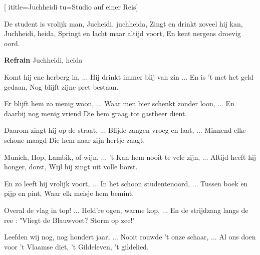  [
ititle={Juchheidi}
tu={Studio auf einer Reis}]

\beginverse
De student is vrolijk man,
Jucheidi, juchheida,
Zingt en drinkt zoveel hij kan,
Juchheidi, heida,
Springt en lacht maar altijd voort,
En kent nergens droevig oord.
\endverse

\beginchorus
\textbf{Refrain}
Juchheidi, heida
\endchorus

\beginverse
Komt hij ene herberg in, ...
Hij drinkt immer blij van zin ...
En is 't met het geld gedaan,
Nog blijft zijne pret bestaan.
\endverse

\beginverse
Er blijft hem zo menig woon, ...
Waar men bier schenkt zonder loon, ...
En daarbij nog menig vriend
Die hem graag tot gastheer dient.
\endverse

\beginverse
Daarom zingt hij op de straat, ...
Blijde zangen vroeg en laat, ...
Minnend elke schone maagd
Die hem naar zijn hertje zaagt.
\endverse

\beginverse
Munich, Hop, Lambik, of wijn, ...
't Kan hem nooit te vele zijn, ...
Altijd heeft hij honger, dorst,
Wijl hij zingt uit volle borst.
\endverse

\beginverse
En zo leeft hij vrolijk voort, ...
In het schoon studentenoord, ...
Tussen boek en pijp en pint,
Waar elk meisje hem bemint.
\endverse

\beginverse
Overal de vlag in top! ...
Held're ogen, warme kop, ...
En de strijdzang langs de ree :
"Vliegt de Blauwvoet? Storm op zee!"
\endverse

\beginverse
Leefden wij nog, nog hondert jaar, ...
Nooit rouwde 't onze schaar, ...
Al ons doen voor 't Vlaamse diet,
't Gildeleven, 't gildelied.
\endverse
\endsong